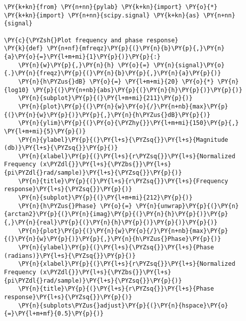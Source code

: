 \documentclass[a4paper,11pt,final]{article}
\begin{document}
\begin{Verbatim}[commandchars=\\\{\},frame=single,fontsize=\small, xleftmargin=0.5em]
\PY{k+kn}{from} \PY{n+nn}{pylab} \PY{k+kn}{import} \PY{o}{*}
\PY{k+kn}{import} \PY{n+nn}{scipy.signal} \PY{k+kn}{as} \PY{n+nn}{signal}

\PY{c}{\PYZsh{}Plot frequency and phase response}
\PY{k}{def} \PY{n+nf}{mfreqz}\PY{p}{(}\PY{n}{b}\PY{p}{,}\PY{n}{a}\PY{o}{=}\PY{l+m+mi}{1}\PY{p}{)}\PY{p}{:}
    \PY{n}{w}\PY{p}{,}\PY{n}{h} \PY{o}{=} \PY{n}{signal}\PY{o}{.}\PY{n}{freqz}\PY{p}{(}\PY{n}{b}\PY{p}{,}\PY{n}{a}\PY{p}{)}
    \PY{n}{h\PYZus{}dB} \PY{o}{=} \PY{l+m+mi}{20} \PY{o}{*} \PY{n}{log10} \PY{p}{(}\PY{n+nb}{abs}\PY{p}{(}\PY{n}{h}\PY{p}{)}\PY{p}{)}
    \PY{n}{subplot}\PY{p}{(}\PY{l+m+mi}{211}\PY{p}{)}
    \PY{n}{plot}\PY{p}{(}\PY{n}{w}\PY{o}{/}\PY{n+nb}{max}\PY{p}{(}\PY{n}{w}\PY{p}{)}\PY{p}{,}\PY{n}{h\PYZus{}dB}\PY{p}{)}
    \PY{n}{ylim}\PY{p}{(}\PY{o}{\PYZhy{}}\PY{l+m+mi}{150}\PY{p}{,} \PY{l+m+mi}{5}\PY{p}{)}
    \PY{n}{ylabel}\PY{p}{(}\PY{l+s}{\PYZsq{}}\PY{l+s}{Magnitude (db)}\PY{l+s}{\PYZsq{}}\PY{p}{)}
    \PY{n}{xlabel}\PY{p}{(}\PY{l+s}{r\PYZsq{}}\PY{l+s}{Normalized Frequency (x\PYZdl{}}\PY{l+s}{\PYZbs{}}\PY{l+s}{pi\PYZdl{}rad/sample)}\PY{l+s}{\PYZsq{}}\PY{p}{)}
    \PY{n}{title}\PY{p}{(}\PY{l+s}{r\PYZsq{}}\PY{l+s}{Frequency response}\PY{l+s}{\PYZsq{}}\PY{p}{)}
    \PY{n}{subplot}\PY{p}{(}\PY{l+m+mi}{212}\PY{p}{)}
    \PY{n}{h\PYZus{}Phase} \PY{o}{=} \PY{n}{unwrap}\PY{p}{(}\PY{n}{arctan2}\PY{p}{(}\PY{n}{imag}\PY{p}{(}\PY{n}{h}\PY{p}{)}\PY{p}{,}\PY{n}{real}\PY{p}{(}\PY{n}{h}\PY{p}{)}\PY{p}{)}\PY{p}{)}
    \PY{n}{plot}\PY{p}{(}\PY{n}{w}\PY{o}{/}\PY{n+nb}{max}\PY{p}{(}\PY{n}{w}\PY{p}{)}\PY{p}{,}\PY{n}{h\PYZus{}Phase}\PY{p}{)}
    \PY{n}{ylabel}\PY{p}{(}\PY{l+s}{\PYZsq{}}\PY{l+s}{Phase (radians)}\PY{l+s}{\PYZsq{}}\PY{p}{)}
    \PY{n}{xlabel}\PY{p}{(}\PY{l+s}{r\PYZsq{}}\PY{l+s}{Normalized Frequency (x\PYZdl{}}\PY{l+s}{\PYZbs{}}\PY{l+s}{pi\PYZdl{}rad/sample)}\PY{l+s}{\PYZsq{}}\PY{p}{)}
    \PY{n}{title}\PY{p}{(}\PY{l+s}{r\PYZsq{}}\PY{l+s}{Phase response}\PY{l+s}{\PYZsq{}}\PY{p}{)}
    \PY{n}{subplots\PYZus{}adjust}\PY{p}{(}\PY{n}{hspace}\PY{o}{=}\PY{l+m+mf}{0.5}\PY{p}{)}


\end{Verbatim}
\end{document}
